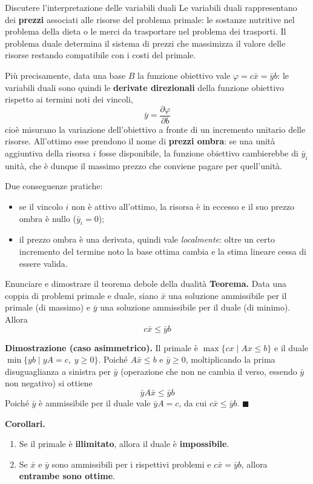 \documentclass[12pt]{extarticle} %
\begin{document}
\begin{teoriabox}{Discutere l'interpretazione delle variabili duali}
Le variabili duali rappresentano dei \textbf{prezzi} associati alle risorse del problema primale: le sostanze nutritive nel problema della dieta o le merci da trasportare nel problema dei trasporti. Il problema duale determina il sistema di prezzi che massimizza il valore delle risorse restando compatibile con i costi del primale.

\noindent Più precisamente, data una base $B$ la funzione obiettivo vale $\varphi = c\bar{x} = \bar{y}b$: le variabili duali sono quindi le \textbf{derivate direzionali} della funzione obiettivo rispetto ai termini noti dei vincoli,
\[
\bar{y} = \frac{\partial \varphi}{\partial b}
\]
cioè misurano la variazione dell'obiettivo a fronte di un incremento unitario delle risorse. All'ottimo esse prendono il nome di \textbf{prezzi ombra}: se una unità aggiuntiva della risorsa $i$ fosse disponibile, la funzione obiettivo cambierebbe di $\bar{y}_i$ unità, che è dunque il massimo prezzo che conviene pagare per quell'unità.

\noindent Due conseguenze pratiche:
\begin{itemize}
    \item se il vincolo $i$ non è attivo all'ottimo, la risorsa è in eccesso e il suo prezzo ombra è nullo ($\bar{y}_i = 0$);
    \item il prezzo ombra è una derivata, quindi vale \textit{localmente}: oltre un certo incremento del termine noto la base ottima cambia e la stima lineare cessa di essere valida.
\end{itemize}
\end{teoriabox}

\begin{teoriabox}{Enunciare e dimostrare il teorema debole della dualità}
\textbf{Teorema.} Data una coppia di problemi primale e duale, siano $\bar{x}$ una soluzione ammissibile per il primale (di massimo) e $\bar{y}$ una soluzione ammissibile per il duale (di minimo). Allora
\[
c\bar{x} \le \bar{y}b
\]

\noindent\textbf{Dimostrazione (caso asimmetrico).} Il primale è $\max\{cx \mid Ax \le b\}$ e il duale $\min\{yb \mid yA = c, \; y \ge 0\}$. Poiché $A\bar{x} \le b$ e $\bar{y} \ge 0$, moltiplicando la prima disuguaglianza a sinistra per $\bar{y}$ (operazione che non ne cambia il verso, essendo $\bar y$ non negativo) si ottiene
\[
\bar{y}A\bar{x} \le \bar{y}b
\]
Poiché $\bar{y}$ è ammissibile per il duale vale $\bar{y}A = c$, da cui $c\bar{x} \le \bar{y}b$. $\blacksquare$

\noindent\textbf{Corollari.}
\begin{enumerate}
    \item Se il primale è \textbf{illimitato}, allora il duale è \textbf{impossibile}.
    \item Se $\bar{x}$ e $\bar{y}$ sono ammissibili per i rispettivi problemi e $c\bar{x} = \bar{y}b$, allora \textbf{entrambe sono ottime}.
\end{enumerate}
\end{teoriabox}
\end{document}
